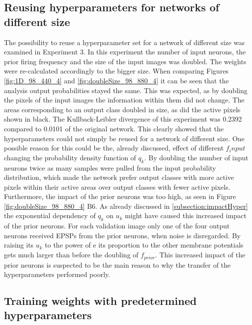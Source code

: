 \subsection{Reusing hyperparameters for networks of different size}

The possibility to reuse a hyperparameter set for a network of different size was examined in Experiment 3. In this experiment the number of input neurons, the prior firing frequency and the size of the input images was doubled. The weights were re-calculated accordingly to the bigger size. When comparing Figures \ref{fig:1D_98_440_4} and \ref{fig:doubleSize_98_880_4} it can be seen that the analysis output probabilities stayed the same. This was expected, as by doubling the pixels of the input images the information within them did not change. The areas corresponding to an output class doubled in size, as did the active pixels shown in black. The Kullback-Leibler divergence of this experiment was 0.2392 compared to 0.0101 of the original network. This clearly showed that the hyperparameters could not simply be reused for a network of different size. One possible reason for this could be the, already discussed, effect of different $f_input$ changing the probability density function of $q_k$. By doubling the number of input neurons twice as many samples were pulled from the input probability distribution, which made the network prefer output classes with more active pixels within their active areas over output classes with fewer active pixels. Furthermore, the impact of the prior neurons was too high, as seen in Figure \ref{fig:doubleSize_98_880_4} B6. As already discussed in \ref{subsection:impactHyper} the exponential dependency of $q_k$ on $u_k$ might have caused this increased impact of the prior neurons. For each validation image only one of the four output neurons received EPSPs from the prior neurons, when noise is disregarded. By raising its $u_k$ to the power of e its proportion to the other membrane potentials gets much larger than before the doubling of $f_{prior}$. This increased impact of the prior neurons is suspected to be the main reason to why the transfer of the hyperparameters performed poorly.

\subsection{Training weights with predetermined hyperparameters}

